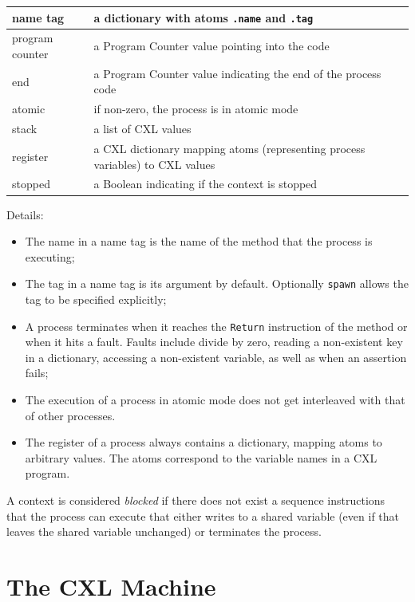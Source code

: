\documentclass{report}
\begin{document}
\vspace{1em}
\begin{tabular}{|l|l|}
\hline
name tag & a dictionary with atoms \texttt{.name} and \texttt{.tag} \\
\hline
program counter & a Program Counter value pointing into the code \\
\hline
end & a Program Counter value indicating the end of the process code \\
\hline
atomic & if non-zero, the process is in atomic mode \\
\hline
stack & a list of CXL values \\
\hline
register & a CXL dictionary mapping atoms (representing process variables) to CXL values \\
\hline
stopped & a Boolean indicating if the context is stopped \\
\hline
\end{tabular}
\vspace{1em}

Details:
\begin{itemize}
\item The name in a name tag is the name of the method that the process
is executing;
\item The tag in a name tag is its argument by default.  Optionally
\texttt{spawn} allows the tag to be specified explicitly;
\item A process terminates when it reaches the \texttt{Return} instruction
of the method or when it hits a fault.  Faults include divide by zero,
reading a non-existent key in a dictionary, accessing a non-existent
variable, as well as when an assertion fails;
\item The execution of a process in atomic mode does not get interleaved
with that of other processes.
\item The register of a process always contains a dictionary, mapping
atoms to arbitrary values.  The atoms correspond to the variable names
in a CXL program.
\end{itemize}

A context is considered \emph{blocked} if there does not exist a
sequence instructions that the process can execute that either writes
to a shared variable (even if that leaves the shared variable unchanged)
or terminates the process.

\chapter{The CXL Machine}
\end{document}
